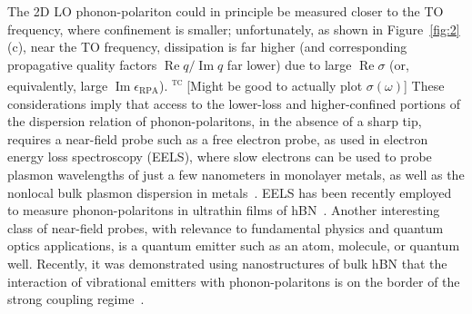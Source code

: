 \documentclass[aps,prb,twocolumn,
	           groupedaddress,superscriptaddress,
               amsfonts,amssymb,amsmath,floatfix,
	           citeautoscript]{revtex4-1}
\renewcommand{\Im}{\operatorname{Im}}
\renewcommand{\Re}{\operatorname{Re}}
\newcommand{\comment}[2]{%
    \ifbool{togglecomments}%
    {\textcolor{blue!70!black}{\small\textsf{%
    \textsuperscript{\textsc{\textsf{\MakeLowercase{#1}}}}%
    [#2]}}} %
    {}}     %
\begin{document}
The 2D LO phonon-polariton could in principle be measured closer to the TO frequency, where confinement is smaller; unfortunately, as shown in Figure~\ref{fig:2}(c), near the TO frequency, dissipation is far higher (and corresponding propagative quality factors $\Re q/\Im q$ far lower) due to large $\Re\sigma$ (or, equivalently, large $\Im\epsilon_{\mathrm{RPA}}$).
\comment{tc}{Might be good to actually plot $\sigma(\omega)$}
These considerations imply that access to the lower-loss and higher-confined portions of the dispersion relation of phonon-polaritons, in the absence of a sharp tip, requires a near-field probe such as a free electron probe, as used in electron energy loss spectroscopy (EELS),  where slow electrons can be used to probe plasmon wavelengths of just a few nanometers in monolayer metals, as well as the nonlocal bulk plasmon dispersion in metals~\cite{nagao2001dispersion, de2010optical,diaconescu2007acoustic}.
EELS has been recently employed to measure phonon-polaritons in ultrathin films of hBN~\cite{govyadinov2017probing}. Another interesting class of near-field probes, with relevance to fundamental physics and quantum optics applications, is a quantum emitter such as an atom, molecule, or quantum well. Recently, it was demonstrated using nanostructures of bulk hBN that the interaction of vibrational emitters with phonon-polaritons is on the border of the strong coupling regime~\cite{autore2018boron}.
\end{document}
